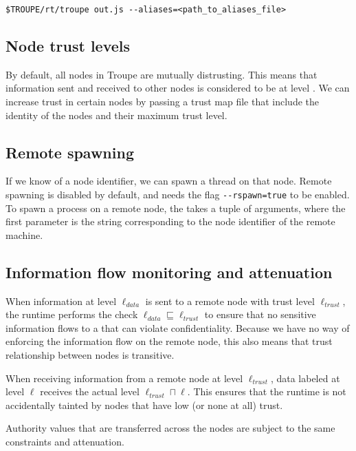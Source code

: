 \begin{verbatim}
$TROUPE/rt/troupe out.js --aliases=<path_to_aliases_file>
\end{verbatim}

\subsection{Node trust levels}

By default, all nodes in Troupe are mutually distrusting. This means that 
information sent and received to other nodes is considered to be at level \lev{}.
We can increase trust in certain nodes by 
passing a trust map file that include the identity of the nodes and their maximum
trust level.

    
\subsection{Remote spawning}
If we know of a node identifier, we can spawn a thread on that node. Remote spawning is 
disabled by default, and needs the flag {\verb|--rspawn=true|} to be enabled.
%
To spawn a process on a remote node, the  takes a tuple of arguments,
where the first parameter is the string corresponding to the node identifier of the remote machine.


\subsection{Information flow monitoring and attenuation}
When information at level $\ell_{\mathit{data}}$ is sent to a remote node with trust level 
$\ell_{\mathit{trust}}$, the runtime performs the check
$\ell_{\mathit{data}} \sqsubseteq \ell_{\mathit{trust}}$ to ensure that no sensitive information 
flows to a that can violate confidentiality. Because we have no way of enforcing the 
information flow on the remote node, this also means that 
trust relationship between nodes is transitive.

When receiving information from a remote node at level $\ell_{\mathit{trust}}$, 
data labeled at level $\ell$ receives the actual level $\ell_{\mathit{trust}} \sqcap \ell$. 
This ensures that the runtime is not accidentally tainted by nodes that have low (or none at all) trust.

Authority values that are transferred across the nodes are subject to the same constraints and attenuation.



\clearpage
\appendix
